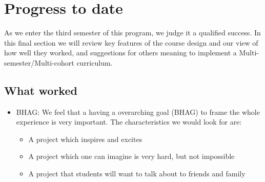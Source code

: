 \section{Progress to date}
As we enter the third semester of this program, we judge it a qualified success. In this final section we will review key features of the course design and our view of how well they worked, and suggestions for others meaning to implement a Multi-semester/Multi-cohort curriculum.
\subsection{What worked}
\begin{itemize}
\item BHAG: We feel that a having a overarching goal (BHAG) to frame the whole experience is very important. The characteristics we would look for are:
\begin{itemize}
\item A project which inspires and excites
\item A project which one can imagine is very hard, but not impossible
\item A project that students will want to talk about to friends and family
\end{itemize}


\end{itemize}
